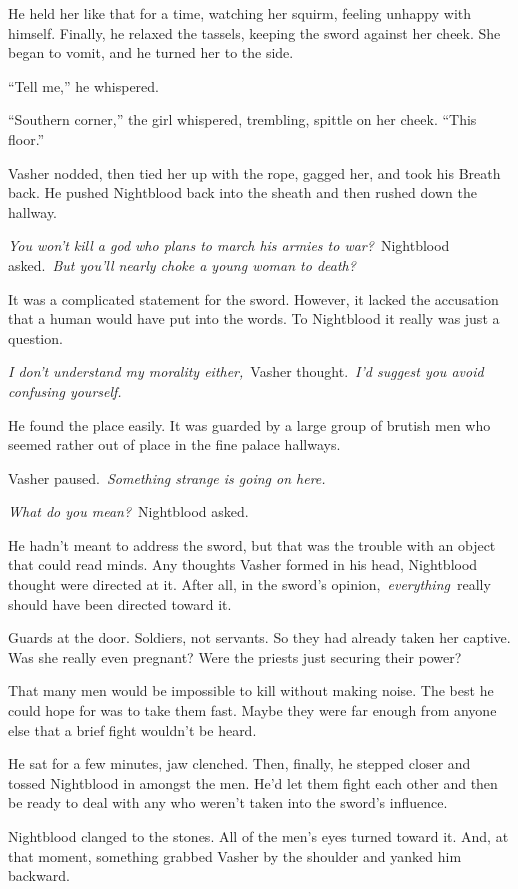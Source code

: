 He held her like that for a time, watching her squirm, feeling unhappy with himself. Finally, he relaxed the tassels, keeping the sword against her cheek. She began to vomit, and he turned her to the side.

“Tell me,” he whispered.

“Southern corner,” the girl whispered, trembling, spittle on her cheek. “This floor.”

Vasher nodded, then tied her up with the rope, gagged her, and took his Breath back. He pushed Nightblood back into the sheath and then rushed down the hallway.

\textit{You won’t kill a god who plans to march his armies to war?}~Nightblood asked.~\textit{But you’ll nearly choke a young woman to death?}

It was a complicated statement for the sword. However, it lacked the accusation that a human would have put into the words. To Nightblood it really was just a question.

\textit{I don’t understand my morality either,}~Vasher thought.~\textit{I’d suggest you avoid confusing yourself.}

He found the place easily. It was guarded by a large group of brutish men who seemed rather out of place in the fine palace hallways.

Vasher paused.~\textit{Something strange is going on here.}

\textit{What do you mean?}~Nightblood asked.

He hadn’t meant to address the sword, but that was the trouble with an object that could read minds. Any thoughts Vasher formed in his head, Nightblood thought were directed at it. After all, in the sword’s opinion,~\textit{everything}~really should have been directed toward it.

Guards at the door. Soldiers, not servants. So they had already taken her captive. Was she really even pregnant? Were the priests just securing their power?

That many men would be impossible to kill without making noise. The best he could hope for was to take them fast. Maybe they were far enough from anyone else that a brief fight wouldn’t be heard.

He sat for a few minutes, jaw clenched. Then, finally, he stepped closer and tossed Nightblood in amongst the men. He’d let them fight each other and then be ready to deal with any who weren’t taken into the sword’s influence.

Nightblood clanged to the stones. All of the men’s eyes turned toward it. And, at that moment, something grabbed Vasher by the shoulder and yanked him backward.


